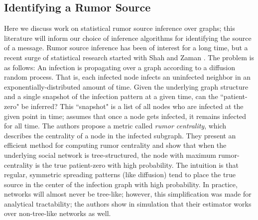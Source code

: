 \subsection{Identifying a Rumor Source}
Here we discuss work on statistical rumor source inference over graphs; this literature will inform our choice of inference algorithms for identifying the source of a message.
Rumor source inference has been of interest for a long time, but a recent surge of statistical research started with Shah and Zaman \cite{shah2011rumors}. The problem is as follows: An infection is propagating over a graph according to a diffusion random process. 
That is, each infected node infects an uninfected neighbor in an exponentially-distributed amount of time.
Given the underlying graph structure and a single snapshot of the infection pattern at a given time, can the ``patient-zero" be inferred?
This ``snapshot" is a list of all nodes who are infected at the given point in time; \cite{shah2011rumors} assumes that once a node gets infected, it remains infected for all time. 
The authors propose a metric called \emph{rumor centrality}, which describes the centrality of a node in the infected subgraph.
They present an efficient method for computing rumor centrality and show that when the underlying social network is tree-structured, the node with maximum rumor-centrality is the true patient-zero with high probability. The intuition is that regular, symmetric spreading patterns (like diffusion) tend to place the true source in the center of the infection graph with high probability. In practice, networks will almost never be tree-like; however, this simplification was made for analytical tractability; the authors show in simulation that their estimator works over non-tree-like networks as well. 

